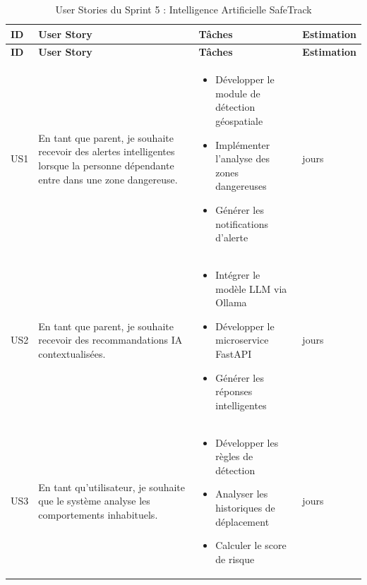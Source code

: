 \small
\setlength{\tabcolsep}{3pt}
\renewcommand{\arraystretch}{1.0}
\setlength{\parskip}{0pt}
\begin{longtable}{|>{\centering\arraybackslash}p{}|>{\raggedright\arraybackslash}p{}|>{\raggedright\arraybackslash}p{}|>{\centering\arraybackslash}p{}|}
\caption{User Stories du Sprint 5 : Intelligence Artificielle SafeTrack} \\
\hline
\textbf{ID} & \textbf{User Story} & \textbf{Tâches} & \textbf{Estimation} \\ \hline
\endfirsthead

\hline
\textbf{ID} & \textbf{User Story} & \textbf{Tâches} & \textbf{Estimation} \\ \hline
\endhead

\hline
\endlastfoot

US1 & En tant que parent, je souhaite recevoir des alertes intelligentes lorsque la personne dépendante entre dans une zone dangereuse.
& \begin{itemize}[leftmargin=*, nosep]
    \item Développer le module de détection géospatiale
    \item Implémenter l’analyse des zones dangereuses
    \item Générer les notifications d’alerte
\end{itemize} & 5 jours \\ \hline

US2 & En tant que parent, je souhaite recevoir des recommandations IA contextualisées.
& \begin{itemize}[leftmargin=*, nosep]
    \item Intégrer le modèle LLM via Ollama \cite{ollama}
    \item Développer le microservice FastAPI
    \item Générer les réponses intelligentes
\end{itemize} & 6 jours \\ \hline

US3 & En tant qu’utilisateur, je souhaite que le système analyse les comportements inhabituels.
& \begin{itemize}[leftmargin=*, nosep]
    \item Développer les règles de détection
    \item Analyser les historiques de déplacement
    \item Calculer le score de risque
\end{itemize} & 5 jours \\ \hline


\end{longtable}
